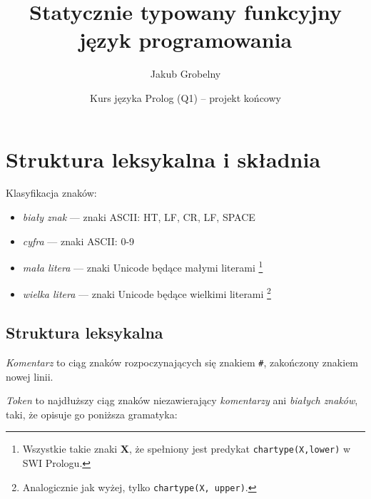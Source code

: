 \documentclass[12pt]{article}
\title{\huge
    \textbf{Statycznie typowany funkcyjny język programowania}}
\date {Kurs języka Prolog (Q1) -- projekt końcowy}
\author{\Large Jakub Grobelny}
\begin{document}
\maketitle

\section{Struktura leksykalna i składnia}

Klasyfikacja znaków:
\begin{itemize}
    \item \textit{biały znak} --- znaki ASCII: HT, LF, CR, LF, SPACE
    \item \textit{cyfra} --- znaki ASCII: 0-9
    \item \textit{mała litera} --- znaki Unicode będące małymi literami 
    \footnote{Wszystkie takie znaki \textbf{X}, że spełniony jest predykat 
        \texttt{char\textunderscore type(X,lower)} w SWI Prologu.}
    \item \textit{wielka litera} --- znaki Unicode będące wielkimi literami
    \footnote{Analogicznie jak wyżej, tylko 
        \texttt{char\textunderscore type(X, upper)}.}
\end{itemize}

\subsection{Struktura leksykalna}

\textit{Komentarz} to ciąg znaków rozpoczynających się znakiem \texttt{\#}, 
zakończony znakiem nowej linii.

\textit{Token} to najdłuższy ciąg znaków niezawierający \textit{komentarzy} ani 
\textit{białych znaków}, taki, że opisuje go poniższa gramatyka:
\end{document}
